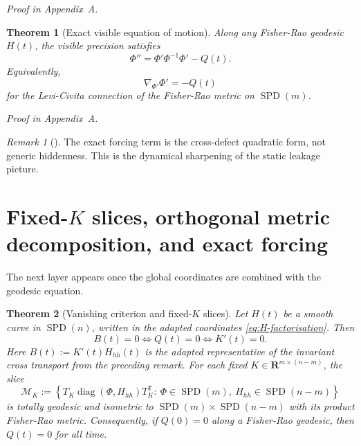 \documentclass[11pt,a4paper]{article}
\numberwithin{equation}{section}
\DeclareMathOperator{\SPD}{SPD}
\DeclareMathOperator{\diag}{diag}
\newcommand{\R}{\mathbf R}
\theoremstyle{thmcompact}
\newtheorem{theorem}{Theorem}[section]
\theoremstyle{remark}
\newtheorem*{remarkplain}{Remark}
\newenvironment{remark}[1][]%
{\begin{remarkbox}\begin{remarkplain}[#1]\normalfont}
{\end{remarkplain}\end{remarkbox}}
\newcommand{\proofappendix}{\par{\hfill\scriptsize\emph{Proof in Appendix~A.}}\par}
\begin{document}
\proofappendix

\begin{theorem}[Exact visible equation of motion]
\label{thm:exact-visible-eom}
Along any Fisher-Rao geodesic $H(t)$, the visible precision satisfies
\begin{equation}
\boxed{\Phi''=\Phi'\Phi^{-1}\Phi' - Q(t).}
\label{eq:exact-visible-eom}
\end{equation}
Equivalently,
\begin{equation}
\nabla_{\Phi'}\Phi'=-Q(t)
\label{eq:covariant-visible-eom}
\end{equation}
for the Levi-Civita connection of the Fisher-Rao metric on $\SPD(m)$.
\end{theorem}

\proofappendix

\begin{remark}
The exact forcing term is the cross-defect quadratic form, not generic hiddenness. This is the dynamical sharpening of the static leakage picture.
\end{remark}

\section{Fixed-$K$ slices, orthogonal metric decomposition, and exact forcing}
\label{sec:adapted-forcing}

The next layer appears once the global coordinates are combined with the geodesic equation.

\begin{theorem}[Vanishing criterion and fixed-$K$ slices]
\label{thm:fixed-K}
Let $H(t)$ be a smooth curve in $\SPD(n)$, written in the adapted coordinates \eqref{eq:H-factorisation}. Then
\begin{equation}
B(t)=0
\iff
Q(t)=0
\iff
K'(t)=0.
\label{eq:q-zero-kzero}
\end{equation}
Here $B(t):=K'(t)H_{hh}(t)$ is the adapted representative of the invariant cross transport from the preceding remark.
For each fixed $K\in\R^{m\times(n-m)}$, the slice
\begin{equation}
\mathcal M_K:=\left\{T_K\diag(\Phi,H_{hh})T_K^{\mathsf T}:\ \Phi\in\SPD(m),\ H_{hh}\in\SPD(n-m)\right\}
\label{eq:MK-def}
\end{equation}
is totally geodesic and isometric to $\SPD(m)\times\SPD(n-m)$ with its product Fisher-Rao metric. Consequently, if $Q(0)=0$ along a Fisher-Rao geodesic, then $Q(t)=0$ for all time.
\end{theorem}
\end{document}
